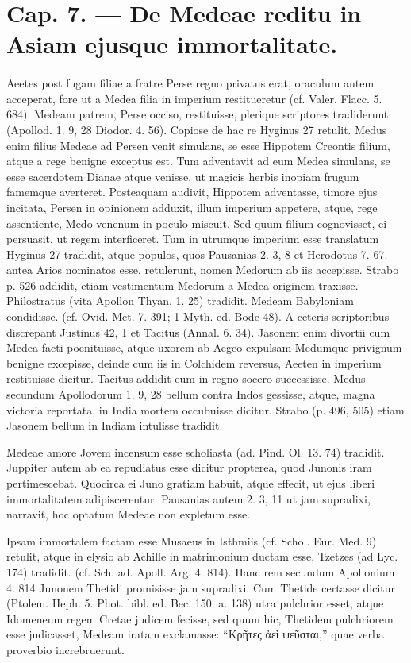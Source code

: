 \documentclass[landscape, a4paper, 11pt, oneside, polutonikogreek, german]{article}
\begin{document}
\section{Cap. 7. --- De Medeae reditu in Asiam ejusque immortalitate.}
\paragraph{}
Aeetes post fugam filiae a fratre Perse regno privatus erat, oraculum autem acceperat, fore ut a Medea filia in imperium restitueretur (cf. Valer. Flacc. 5. 684). Medeam patrem, Perse occiso, restituisse, plerique scriptores tradiderunt (Apollod. 1. 9, 28 Diodor. 4. 56). Copiose de hac re Hyginus 27 retulit. Medus enim filius Medeae ad Persen venit simulans, se esse Hippotem Creontis filium, atque a rege benigne exceptus est. Tum adventavit ad eum Medea simulans, se esse sacerdotem Dianae atque venisse, ut magicis herbis inopiam frugum famemque averteret. Posteaquam audivit, Hippotem adventasse, timore ejus incitata, Persen in opinionem adduxit, illum imperium appetere, atque, rege assentiente, Medo venenum in poculo miscuit. Sed quum filium cognovisset, ei persuasit, ut regem interficeret. Tum in utrumque imperium esse translatum Hyginus 27 tradidit, atque populos, quos Pausanias 2. 3, 8 et Herodotus 7. 67. antea Arios nominatos esse, retulerunt, nomen Medorum ab iis accepisse. Strabo p. 526 addidit, etiam vestimentum Medorum a Medea originem traxisse. Philostratus (vita Apollon Thyan. 1. 25) tradidit. Medeam Babyloniam condidisse. (cf. Ovid. Met. 7. 391; 1 Myth. ed. Bode 48). A ceteris scriptoribus discrepant Justinus 42, 1 et Tacitus (Annal. 6. 34). Jasonem enim divortii cum Medea facti poenituisse, atque uxorem ab Aegeo expulsam Medumque privignum benigne excepisse, deinde cum iis in Colchidem reversus, Aeeten in imperium restituisse dicitur. Tacitus addidit eum in regno socero successisse. Medus secundum Apollodorum 1. 9, 28 bellum contra Indos gessisse, atque, magna victoria reportata, in India mortem occubuisse dicitur. Strabo (p. 496, 505) etiam Jasonem bellum in Indiam intulisse tradidit.

Medeae amore Jovem incensum esse scholiasta (ad. Pind. Ol. 13. 74) tradidit. Juppiter autem ab ea repudiatus esse dicitur propterea, quod Junonis iram pertimescebat. Quocirca ei Juno gratiam habuit, atque effecit, ut ejus liberi immortalitatem adipiscerentur. Pausanias autem 2. 3, 11 ut jam supradixi, narravit, hoc optatum Medeae non expletum esse.

Ipsam immortalem factam esse Musaeus in Isthmiis (cf. Schol. Eur. Med. 9) retulit, atque in elysio ab Achille in matrimonium ductam esse, Tzetzes (ad Lyc. 174) tradidit. (cf. Sch. ad. Apoll. Arg. 4. 814). Hanc rem secundum Apollonium 4. 814 Junonem Thetidi promisisse jam supradixi. Cum Thetide certasse dicitur (Ptolem. Heph. 5. Phot. bibl. ed. Bec. 150. a. 138) utra pulchrior esset, atque Idomeneum regem Cretae judicem fecisse, sed quum hic, Thetidem pulchriorem esse judicasset, Medeam iratam exclamasse: "`Κρῆτες ἀεὶ ψεῦσται,"' quae verba proverbio increbruerunt.
\end{document}
